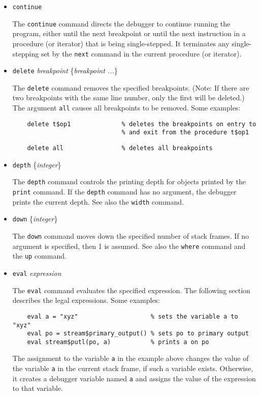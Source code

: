 \begin{itemize}
\item {\tt continue}
  
  The {\tt continue} command directs the debugger to continue running
  the program, either until the next breakpoint or until the next
  instruction in a procedure (or iterator) that is being single-stepped.
  It terminates any single-stepping set by the {\tt next} command in the
  current procedure (or iterator).

\item {\tt delete} {\it breakpoint} \{{\it breakpoint ...}\}
  
  The {\tt delete} command removes the specified breakpoints.  (Note: If
  there are two breakpoints with the same line number, only the first
  will be deleted.)  The argument {\tt all} causes all breakpoints to be
  removed.  Some examples:
  \begin{verbatim}
    delete t$op1              % deletes the breakpoints on entry to
                              % and exit from the procedure t$op1
  \end{verbatim}
  \begin{verbatim}
    delete all                % deletes all breakpoints
  \end{verbatim}

\item {\tt depth} \{{\it integer}\}
  
  The {\tt depth} command controls the printing depth for objects
  printed by the {\tt print} command.  If the {\tt depth} command has
  no argument, the debugger prints the current depth.  See also the
  {\tt width} command.

\item {\tt down} \{{\it integer}\}
  
  The {\tt down} command moves down the specified number of stack
  frames.  If no argument is specified, then 1 is assumed.  See also
  the {\tt where} command and the {\tt up} command.

\item {\tt eval} {\it expression}
  
  The {\tt eval} command evaluates the specified expression.  The
  following section describes the legal expressions.  Some examples:
  \begin{verbatim}
    eval a = "xyz"                    % sets the variable a to "xyz"
    eval po = stream$primary_output() % sets po to primary output
    eval stream$putl(po, a)           % prints a on po
  \end{verbatim}
  \noindent The assignment to the variable {\tt a} in the example
  above changes the value of the variable {\tt a} in the current stack
  frame, if such a variable exists.  Otherwise, it creates a debugger
  variable named {\tt a} and assigns the value of the expression to
  that variable.


\end{itemize}
